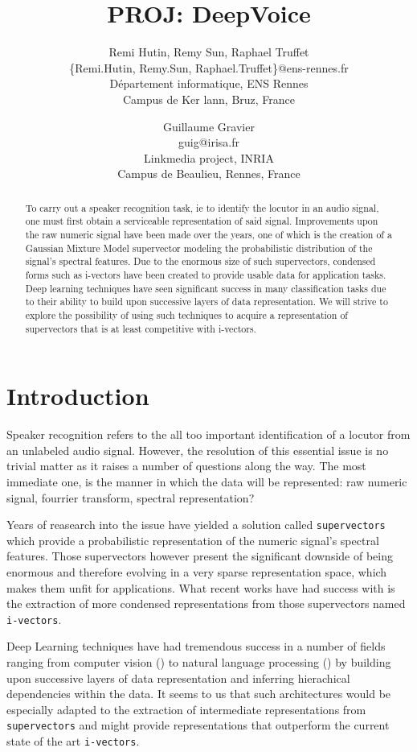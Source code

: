 \documentclass[conference]{IEEEtran}
\title{PROJ: DeepVoice}
\author{Remi Hutin, Remy Sun, Raphael Truffet \\
  \{Remi.Hutin, Remy.Sun, Raphael.Truffet\}@ens-rennes.fr \\
  Département informatique, ENS Rennes \\
  Campus de Ker lann, Bruz, France
\and
  Guillaume Gravier \\
  guig@irisa.fr\\
  Linkmedia project, INRIA \\
  Campus de Beaulieu, Rennes, France
 }
\begin{document}
\maketitle

\begin{abstract}
  To carry out a speaker recognition task, ie to identify the locutor in an
audio signal, one must first obtain a serviceable representation
of said signal. Improvements upon the raw numeric signal have been made over the years, one
of which is the creation of a Gaussian Mixture Model supervector modeling the
probabilistic distribution of the signal's
spectral features. Due to the enormous size of such supervectors, condensed
forms such as i-vectors have been created to provide usable data for application
tasks. Deep learning techniques have seen significant success in many
classification tasks due to their ability to
build upon successive layers of data representation. We will
strive to explore the possibility of using such techniques to acquire a
representation of supervectors that is at least competitive with i-vectors.
\end{abstract}

\section{Introduction}

Speaker recognition refers to the all too important identification of a locutor
from an unlabeled audio signal. However, the resolution of this essential issue
is no trivial matter as it raises a number of questions along the way. The most
immediate one, is the manner in which the data will be represented: raw numeric
signal, fourrier transform, spectral representation? 

Years of reasearch into the issue have yielded a solution called
\texttt{supervectors} which provide a probabilistic representation of the
numeric signal's spectral features. Those supervectors however present the
significant downside of being enormous and therefore evolving in a very sparse
representation space, which makes them unfit for applications. What recent works
have had success with is the extraction of more condensed representations from
those supervectors named \texttt{i-vectors}.

Deep Learning techniques have had tremendous success in a number of fields
ranging from computer vision (\cite{lecun1998gradient}) to natural language
processing (\cite{bordes2012joint}) by building upon successive layers of data
representation and inferring hierachical dependencies within the data. It seems
to us that such architectures would be especially adapted to the extraction of
intermediate representations from \texttt{supervectors} and might provide
representations that outperform the current state of the art \texttt{i-vectors}.
\end{document}

